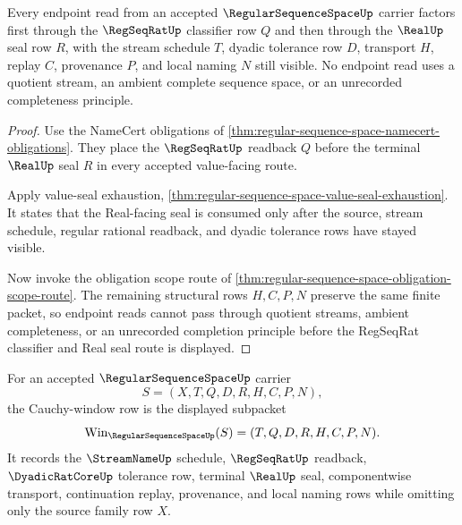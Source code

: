 \begin{theorem}
\label{thm:regular-sequence-space-regseqrat-real-seal-route}
Every endpoint read from an accepted $\RegularSequenceSpaceUp$ carrier factors first through the $\RegSeqRatUp$ classifier row $Q$ and then through the $\RealUp$ seal row $R$, with the stream schedule $T$, dyadic tolerance row $D$, transport $H$, replay $C$, provenance $P$, and local naming $N$ still visible. No endpoint read uses a quotient stream, an ambient complete sequence space, or an unrecorded completeness principle.
\end{theorem}
\begin{proof}
Use the NameCert obligations of \autoref{thm:regular-sequence-space-namecert-obligations}. They place the $\RegSeqRatUp$ readback $Q$ before the terminal $\RealUp$ seal $R$ in every accepted value-facing route.

Apply value-seal exhaustion, \autoref{thm:regular-sequence-space-value-seal-exhaustion}. It states that the Real-facing seal is consumed only after the source, stream schedule, regular rational readback, and dyadic tolerance rows have stayed visible.

Now invoke the obligation scope route of \autoref{thm:regular-sequence-space-obligation-scope-route}. The remaining structural rows $H,C,P,N$ preserve the same finite packet, so endpoint reads cannot pass through quotient streams, ambient completeness, or an unrecorded completion principle before the RegSeqRat classifier and Real seal route is displayed.
\end{proof}

\begin{definition}
\label{def:regular-sequence-space-cauchy-window}
For an accepted $\RegularSequenceSpaceUp$ carrier
$$
S=(X,T,Q,D,R,H,C,P,N),
$$
the Cauchy-window row is the displayed subpacket
$$
\mathrm{Win}_{\RegularSequenceSpaceUp}(S)=(T,Q,D,R,H,C,P,N).
$$
It records the $\StreamNameUp$ schedule, $\RegSeqRatUp$ readback, $\DyadicRatCoreUp$ tolerance row, terminal $\RealUp$ seal, componentwise transport, continuation replay, provenance, and local naming rows while omitting only the source family row $X$.
\end{definition}

